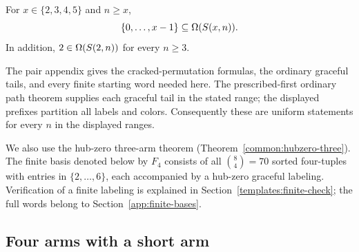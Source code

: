 \begin{proposition}\label{seven:small-pairs}
For $x\in\{2,3,4,5\}$ and $n\ge x$,
\[
   \{0,\ldots,x-1\}\subseteq\Omega(S\!\left(x,n\right)).
\]
In addition, $2\in\Omega(S\!\left(2,n\right))$ for every $n\ge3$.
\end{proposition}

The pair appendix gives the cracked-permutation formulas, the ordinary
graceful tails, and every finite starting word needed here.  The prescribed-first ordinary path theorem supplies each graceful
tail in the stated range; the displayed prefixes partition all labels and colors.  Consequently these are uniform
statements for every $n$ in the displayed ranges.

We also use the hub-zero three-arm theorem
(Theorem~\ref{common:hubzero-three}).  The finite basis denoted below by
$F_4$ consists of all $\binom84=70$ sorted four-tuples with
entries in $\{2,\ldots,6\}$, each accompanied by a hub-zero graceful
labeling.  Verification of a finite labeling is explained in
Section~\ref{templates:finite-check}; the full words belong to
Section~\ref{app:finite-bases}.

\subsection{Four arms with a short arm}
\label{seven:four-short-section}

